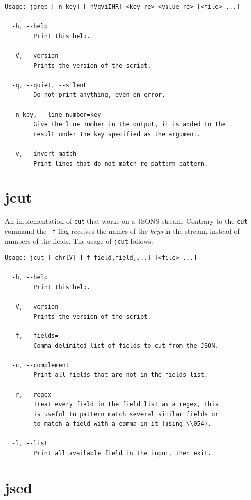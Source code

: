 \documentclass[11pt,a4paper,twoside,openright]{report}
\begin{document}
{\small
\begin{Verbatim}[samepage=true]
Usage: jgrep [-n key] [-hVqviIHR] <key re> <value re> [<file> ...]

  -h, --help
        Print this help.

  -V, --version
        Prints the version of the script.

  -q, --quiet, --silent
        Do not print anything, even on error.

  -n key, --line-number=key
        Give the line number in the output, it is added to the
        result under the key specified as the argument.

  -v, --invert-match
        Print lines that do not match re pattern pattern.
\end{Verbatim}
}

\section{jcut}

An implementation of \texttt{cut} that works on a JSONS stream.  Contrary to
the \texttt{cut} command the \texttt{-f} flag receives the names of the
\emph{keys} in the stream, instead of numbers of the fields.  The usage of
\texttt{jcut} follows:

{\small
\begin{Verbatim}[samepage=true]
Usage: jcut [-chrlV] [-f field,field,...] [<file> ...]

  -h, --help
        Print this help.

  -V, --version
        Prints the version of the script.

  -f, --fields=
        Comma delimited list of fields to cut from the JSON.

  -c, --complement
        Print all fields that are not in the fields list.

  -r, --regex
        Treat every field in the field list as a regex, this
        is useful to pattern match several similar fields or
        to match a field with a comma in it (using \\054).

  -l, --list
        Print all available field in the input, then exit.
\end{Verbatim}
}

\section{jsed}
\end{document}
